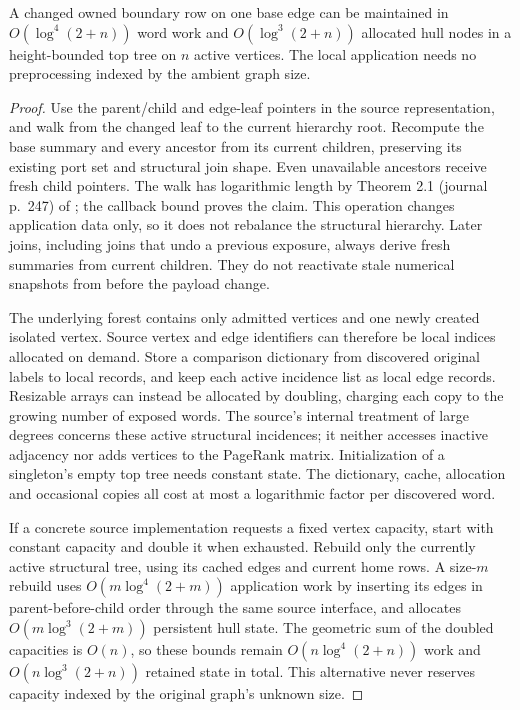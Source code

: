 \begin{lemma}
\label{lem:op3-top-tree-payload}
A changed owned boundary row on one base edge can be maintained in
$O(\log^4(2+n))$ word work and $O(\log^3(2+n))$ allocated hull nodes in a
height-bounded top tree on $n$ active vertices. The local application needs
no preprocessing indexed by the ambient graph size.
\end{lemma}
\begin{proof}
Use the parent/child and edge-leaf pointers in the source representation,
and walk from the changed leaf to the current hierarchy root. Recompute the
base summary and every ancestor from its current children, preserving its
existing port set and structural join shape. Even unavailable ancestors
receive fresh child pointers. The walk has logarithmic length by Theorem 2.1 (journal p.\ 247)
of \cite{alstrup2005toptrees}; the callback bound proves the claim. This
operation changes application data only, so it does not rebalance the
structural hierarchy. Later joins, including joins that undo a previous
exposure, always derive fresh summaries from current children. They do not
reactivate stale numerical snapshots from before the payload change.

The underlying forest contains only admitted vertices and one newly created
isolated vertex. Source vertex and edge identifiers can therefore be local
indices allocated on demand. Store a comparison dictionary from discovered
original labels to local records, and keep each active incidence list as
local edge records. Resizable arrays can instead be allocated by doubling,
charging each copy to the growing number of exposed words. The source's
internal treatment of large degrees concerns these active structural
incidences; it neither accesses inactive adjacency nor adds vertices to the
PageRank matrix. Initialization of a singleton's empty top tree needs
constant state. The dictionary, cache, allocation and occasional copies all
cost at most a logarithmic factor per discovered word.

If a concrete source implementation requests a fixed vertex capacity,
start with constant capacity and double it when exhausted. Rebuild only
the currently active structural tree, using its cached edges and current
home rows. A size-$m$ rebuild uses $O(m\log^4(2+m))$ application work by
inserting its edges in parent-before-child order through the same source
interface, and allocates
$O(m\log^3(2+m))$ persistent hull state. The geometric sum of the doubled
capacities is $O(n)$, so these bounds remain $O(n\log^4(2+n))$ work and
$O(n\log^3(2+n))$ retained state in total. This alternative never reserves
capacity indexed by the original graph's unknown size.
\end{proof}

